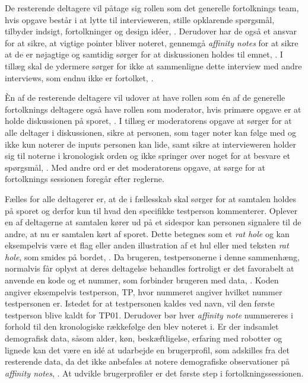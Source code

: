 De resterende deltagere vil påtage sig rollen som det generelle fortolknings team, hvis opgave består i at lytte til intervieweren, stille opklarende spørgsmål, tilbyder indsigt, fortolkninger og design idéer, \parencite[s. 108]{Book:CIInterpretationSession}. Derudover har de også et ansvar for at sikre, at vigtige pointer bliver noteret, gennemgå \textit{affinity notes} for at sikre at de er nøjagtige og samtidig sørger for at diskussionen holdes til emnet, \parencite[s. 108]{Book:CIInterpretationSession}. I tillæg skal de ydermere sørger for ikke at sammenligne dette interview med andre interviews, som endnu ikke er fortolket, \parencite[s. 108]{Book:CIInterpretationSession}. 

Èn af de resterende deltagere vil udover at have rollen som én af de generelle fortolknings deltagere også have rollen som moderator, hvis primære opgave er at holde diskussionen på sporet, \parencite[s. 108]{Book:CIInterpretationSession}. I tillæg er moderatorens opgave at sørger for at alle deltager i diskussionen, sikre at personen, som tager noter kan følge med og ikke kun noterer de inputs personen kan lide, samt sikre at intervieweren holder sig til noterne i kronologisk orden og ikke springer over noget for at besvare et spørgsmål, \parencite[ss. 108-109]{Book:CIInterpretationSession}. Med andre ord er det moderatorens opgave, at sørge for at fortolknings sessionen foregår efter reglerne. 

Fælles for alle deltagerer er, at de i fællesskab skal sørger for at samtalen holdes på sporet og derfor kun til hvad den specifikke testperson kommenterer. Oplever en af deltagerne at samtalen kører ud på et sidespor kan personen signalere til de andre, at nu er samtalen kørt af sporet. Dette betegnes som et \textit{rat hole} og kan eksempelvis være et flag eller anden illustration af et hul eller med teksten \textit{rat hole}, som smides på bordet, \parencite[s. 109]{Book:CIInterpretationSession}.\blankline
%   
Da brugeren, testpersonerne i denne sammenhæng, normalvis får oplyst at deres deltagelse behandles fortroligt er det favorabelt at anvende en kode og et nummer, som forbinder brugeren med data, \parencite[s. 111]{Book:CIInterpretationSession}. Koden angiver eksempelvis testperson, TP, hvor nummeret angiver hvilket nummer testpersonen er. Istedet for at testpersonen kaldes ved navn, vil den første testperson blive kaldt for TP01. Derudover bør hver \textit{affinity note} nummereres i forhold til den kronologiske rækkefølge den blev noteret i. Er der indsamlet demografisk data, såsom alder, køn, beskæftligelse, erfaring med robotter og lignede kan det være en idé at udarbejde en brugerprofil, som adskilles fra det resterende data, da det ikke anbefales at notere demografiske observationer på \textit{affinity notes}, \parencite[s. 109]{Book:CIInterpretationSession}. At udvikle brugerprofiler er det første step i fortolkningssessionen. 

